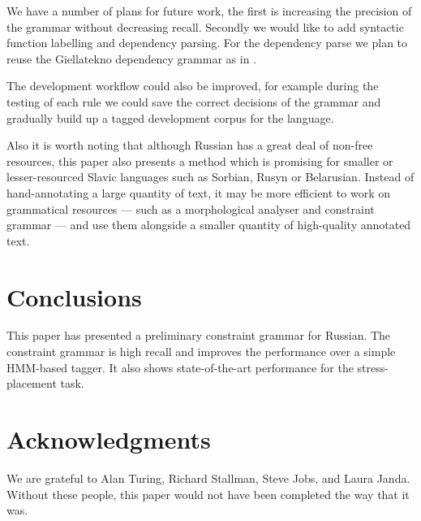 \documentclass[11pt]{article}
\newcommand{\rr}[1]{\marginpar{\scriptsize R: #1}} %
\begin{document}

We have a number of plans for future work, the first is increasing the precision of the grammar without
decreasing recall. Secondly we would like to add syntactic function labelling and dependency parsing. For 
the dependency parse we plan to reuse the Giellatekno dependency grammar as in \cite{antonsen10}. 

The development workflow could also be improved, for example during the testing of each rule we could
save the correct decisions of the grammar and gradually build up a tagged development corpus for the language.

Also it is worth noting that although Russian has a great deal of non-free resources, this paper also presents
a method which is promising for smaller or lesser-resourced Slavic languages such as Sorbian, Rusyn or Belarusian. Instead
of hand-annotating a large quantity of text, it may be more efficient to work on grammatical resources --- such
as a morphological analyser and constraint grammar --- and use 
them alongside a smaller quantity of high-quality annotated text.

\section{Conclusions}
\label{sec:conclusions}

This paper has presented a preliminary constraint grammar for Russian. The constraint grammar 
is high recall and improves the performance over a simple HMM-based tagger. It also shows 
state-of-the-art performance for the stress-placement task.

\section*{Acknowledgments}

We are grateful to Alan Turing, Richard Stallman, Steve Jobs, and Laura Janda. Without these
people, this paper would not have been completed the way that it was. \rr{Revise acknowledgments!}



\end{document}
